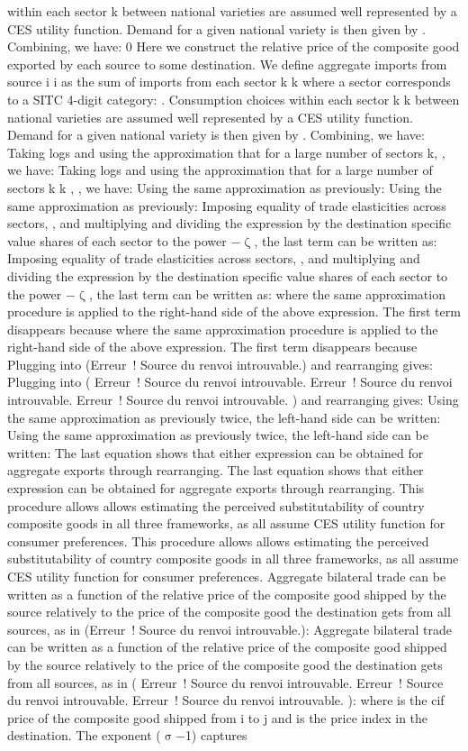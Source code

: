 \documentclass[12pt,twoside,a4paper,notitlepage]{article}
\begin{document}
within each sector k between national varieties are assumed well represented by a CES utility function. Demand for a given national variety is then given by . Combining, we have: 0 Here we construct the relative price of the composite good exported by each source to some destination. We define aggregate imports from source i i as the sum of imports from each sector k k where a sector corresponds to a SITC 4-digit category: . Consumption choices within each sector k k between national varieties are assumed well represented by a CES utility function. Demand for a given national variety is then given by . Combining, we have: Taking logs and using the approximation that for a large number of sectors k, , we have: Taking logs and using the approximation that for a large number of sectors k k , , we have: Using the same approximation as previously: Using the same approximation as previously: Imposing equality of trade elasticities across sectors, , and multiplying and dividing the expression by the destination specific value shares of each sector to the power ${-}$${\upzeta}$, the last term can be written as: Imposing equality of trade elasticities across sectors, , and multiplying and dividing the expression by the destination specific value shares of each sector to the power ${-}$${\upzeta}$, the last term can be written as: where the same approximation procedure is applied to the right-hand side of the above expression. The first term disappears because where the same approximation procedure is applied to the right-hand side of the above expression. The first term disappears because Plugging into (Erreur~! Source du renvoi introuvable.) and rearranging gives: Plugging into ( Erreur~! Source du renvoi introuvable. Erreur~! Source du renvoi introuvable. Erreur~! Source du renvoi introuvable. ) and rearranging gives: Using the same approximation as previously twice, the left-hand side can be written: Using the same approximation as previously twice, the left-hand side can be written: The last equation shows that either expression can be obtained for aggregate exports through rearranging. The last equation shows that either expression can be obtained for aggregate exports through rearranging. This procedure allows allows estimating the perceived substitutability of country composite goods in all three frameworks, as all assume CES utility function for consumer preferences. This procedure allows allows estimating the perceived substitutability of country composite goods in all three frameworks, as all assume CES utility function for consumer preferences. Aggregate bilateral trade can be written as a function of the relative price of the composite good shipped by the source relatively to the price of the composite good the destination gets from all sources, as in (Erreur~! Source du renvoi introuvable.): Aggregate bilateral trade can be written as a function of the relative price of the composite good shipped by the source relatively to the price of the composite good the destination gets from all sources, as in ( Erreur~! Source du renvoi introuvable. Erreur~! Source du renvoi introuvable. Erreur~! Source du renvoi introuvable. ): where is the cif price of the composite good shipped from i to j and is the price index in the destination. The exponent (${\upsigma}$${-}$1) captures 
\end{document}
